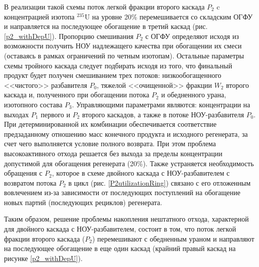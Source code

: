 В реализации такой схемы поток легкой фракции второго каскада $P_2$ c концентрацией изотопа $^{235}$U на уровне 20\% перемешивается со складским ОГФУ и направляется на последующее обогащение в третий каскад (рис. \ref{p2_withDepU}). Пропорцию смешивания $P_2$ с ОГФУ определяют исходя из возможности получить НОУ надлежащего качества при обогащении их смеси (оставаясь в рамках ограничений по четным изотопам). Остальные параметры схемы тройного каскада следует подбирать исходя из того, что финальный продукт будет получен смешиванием трех потоков: низкообогащенного <<чистого>> разбавителя $P_0$, тяжелой <<очищенной>> фракции $W_2$ второго каскада и, полученного при обогащении потока $P_2$ и обедненного урана, изотопного состава $P_3$. Управляющими параметрами являются: концентрации на выходах $P_1$ первого и $P_2$ второго каскадов, а также в потоке НОУ-разбавителя $P_0$. При детерминированной их комбинации обеспечивается соответствие предзаданному отношению масс конечного продукта и исходного регенерата, за счет чего выполняется условие полного возврата. При этом проблема высокоактивного отхода решается без выхода за пределы концентрации допустимой для обогащения регенерата (20\%). Также устраняется необходимость обращения с $P_2$, которое в схеме двойного каскада с НОУ-разбавителем с возвратом потока $P_2$ в цикл (рис. \ref{P2utilizationRing}) связано с его отложенным вовлечением из-за зависимости от последующих поступлений на обогащение новых партий (последующих рециклов) регенерата.

Таким образом, решение проблемы накопления нештатного отхода, характерной для двойного каскада с НОУ-разбавителем, состоит в том, что поток легкой фракции второго каскада ($P_2$) перемешивают с обедненным ураном и направляют на последующее обогащение в еще один каскад (крайний правый каскад на рисунке \ref{p2_withDepU}).


